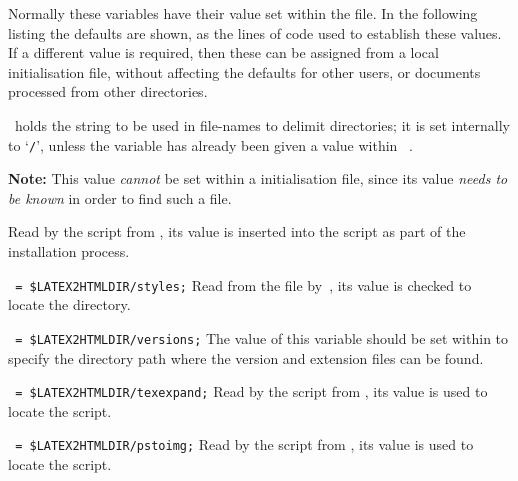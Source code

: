 Normally these variables have their value set within the  file.
In the following listing the defaults are shown, as the lines of \Perl{} code
used to establish these values.
If a different value is required, then these can be assigned from
a local  initialisation file,
without affecting the defaults for other users,
or documents processed from other directories.

\begin{htmllist}%
%
%
\item [\fn{\$dd} ]
~holds the string to be used in file-names to delimit directories;
it is set internally to `\texttt{/}', unless the variable has already been given
a value within ~.

\noindent
\textbf{Note:} This value \emph{cannot} be set within a 
initialisation file, since its value \emph{needs to be known}
in order to find such a file.

%
\item [\fn{\$LATEX2HTMLDIR}] \latex{ }%
Read by the  script from ,
its value is inserted into the  \Perl{} script as part
of the installation process.

\item [\fn{\$LATEX2HTMLSTYLES}\texttt{ = \char34\$LATEX2HTMLDIR/styles\char34;}]
Read from the  file by \,,
its value is checked to locate the  directory.

\item [\fn{\$LATEX2HTMLVERSIONS}\texttt{ = \char34\$LATEX2HTMLDIR/versions\char34;}]
The value of this variable should be set within 
to specify the directory path where the version and extension files can be found.

%
\item [\fn{\$TEXEXPAND}\texttt{  = \char34\$LATEX2HTMLDIR/texexpand\char34;}]
Read by the  \Perl{} script from ,
its value is used to locate the  \Perl{} script.

\item [\fn{\$PSTOIMG}\texttt{ = \char34\$LATEX2HTMLDIR/pstoimg\char34;}]
Read by the  \Perl{} script from ,
its value is used to locate the  \Perl{} script.


\end{htmllist}

